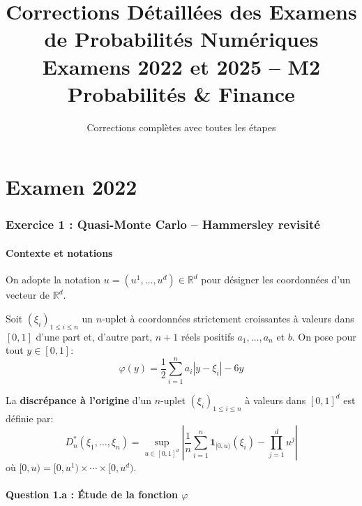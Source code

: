 \documentclass[12pt,a4paper]{article}
\title{\textbf{Corrections Détaillées des Examens de Probabilités Numériques}\\
\large Examens 2022 et 2025 -- M2 Probabilités \& Finance}
\author{Corrections complètes avec toutes les étapes}
\date{}
\theoremstyle{definition}
\newcommand{\R}{\mathbb{R}}
\newcommand{\ind}{\mathbf{1}}
\begin{document}
\maketitle
\tableofcontents
\newpage

\part{Examen 2022}

\section{Exercice 1 : Quasi-Monte Carlo -- Hammersley revisité}

\subsection{Contexte et notations}

On adopte la notation $u = (u^1, \ldots, u^d) \in \R^d$ pour désigner les coordonnées d'un vecteur de $\R^d$.

Soit $(\xi_i)_{1 \leq i \leq n}$ un $n$-uplet à coordonnées strictement croissantes à valeurs dans $[0,1]$ d'une part et, d'autre part, $n+1$ réels positifs $a_1, \ldots, a_n$ et $b$. On pose pour tout $y \in [0,1]$:
\[
\varphi(y) = \frac{1}{2} \sum_{i=1}^{n} a_i |y - \xi_i| - 6y
\]

\begin{rappel}
La \textbf{discrépance à l'origine} d'un $n$-uplet $(\xi_i)_{1\leq i \leq n}$ à valeurs dans $[0,1]^d$ est définie par:
\[
D_n^*(\xi_1, \ldots, \xi_n) = \sup_{u \in [0,1]^d} \left| \frac{1}{n} \sum_{i=1}^{n} \ind_{[0,u)}(\xi_i) - \prod_{j=1}^{d} u^j \right|
\]
où $[0,u) = [0,u^1) \times \cdots \times [0,u^d)$.
\end{rappel}

\subsection{Question 1.a : Étude de la fonction $\varphi$}
\end{document}
